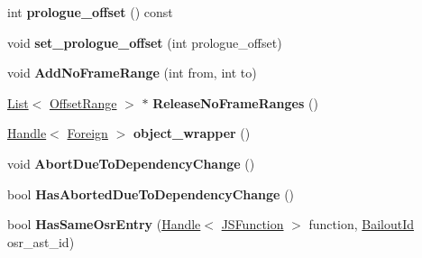 \begin{DoxyCompactItemize}
\item 
\hypertarget{classv8_1_1internal_1_1_compilation_info_a9e43975d9d2b1f354d4fc0960686812c}{}int {\bfseries prologue\+\_\+offset} () const \label{classv8_1_1internal_1_1_compilation_info_a9e43975d9d2b1f354d4fc0960686812c}

\item 
\hypertarget{classv8_1_1internal_1_1_compilation_info_a4f79f6d655aaac63f51751efa7ef6e5a}{}void {\bfseries set\+\_\+prologue\+\_\+offset} (int prologue\+\_\+offset)\label{classv8_1_1internal_1_1_compilation_info_a4f79f6d655aaac63f51751efa7ef6e5a}

\item 
\hypertarget{classv8_1_1internal_1_1_compilation_info_a7cdb1edb777c7ff54d596be00673004f}{}void {\bfseries Add\+No\+Frame\+Range} (int from, int to)\label{classv8_1_1internal_1_1_compilation_info_a7cdb1edb777c7ff54d596be00673004f}

\item 
\hypertarget{classv8_1_1internal_1_1_compilation_info_a3b5e068efabf70746688e9e6dd5b835f}{}\hyperlink{classv8_1_1internal_1_1_list}{List}$<$ \hyperlink{structv8_1_1internal_1_1_offset_range}{Offset\+Range} $>$ $\ast$ {\bfseries Release\+No\+Frame\+Ranges} ()\label{classv8_1_1internal_1_1_compilation_info_a3b5e068efabf70746688e9e6dd5b835f}

\item 
\hypertarget{classv8_1_1internal_1_1_compilation_info_a9e6a601ceeab13bfe09ae2153a49d384}{}\hyperlink{classv8_1_1internal_1_1_handle}{Handle}$<$ \hyperlink{classv8_1_1internal_1_1_foreign}{Foreign} $>$ {\bfseries object\+\_\+wrapper} ()\label{classv8_1_1internal_1_1_compilation_info_a9e6a601ceeab13bfe09ae2153a49d384}

\item 
\hypertarget{classv8_1_1internal_1_1_compilation_info_a4f97576fc5a469a3db10c3308b9a8f94}{}void {\bfseries Abort\+Due\+To\+Dependency\+Change} ()\label{classv8_1_1internal_1_1_compilation_info_a4f97576fc5a469a3db10c3308b9a8f94}

\item 
\hypertarget{classv8_1_1internal_1_1_compilation_info_a7008134e3a75c38a911bb553128afc30}{}bool {\bfseries Has\+Aborted\+Due\+To\+Dependency\+Change} ()\label{classv8_1_1internal_1_1_compilation_info_a7008134e3a75c38a911bb553128afc30}

\item 
\hypertarget{classv8_1_1internal_1_1_compilation_info_aa5cfd2659137f69732afb039fdac49b0}{}bool {\bfseries Has\+Same\+Osr\+Entry} (\hyperlink{classv8_1_1internal_1_1_handle}{Handle}$<$ \hyperlink{classv8_1_1internal_1_1_j_s_function}{J\+S\+Function} $>$ function, \hyperlink{classv8_1_1internal_1_1_bailout_id}{Bailout\+Id} osr\+\_\+ast\+\_\+id)\label{classv8_1_1internal_1_1_compilation_info_aa5cfd2659137f69732afb039fdac49b0}


\end{DoxyCompactItemize}
